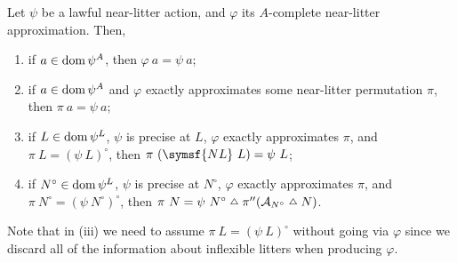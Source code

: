 \begin{lemma}
    \label{lem:NearLitterAction.complete_spec}
    Let \( \psi \) be a lawful near-litter action, and \( \varphi \) its \( A \)-complete near-litter approximation.
    Then,
    \begin{enumerate}
        \item if \( a \in \operatorname{dom} \psi^A \), then \( \varphi\ a = \psi\ a \);
        \item if \( a \in \operatorname{dom} \psi^A \) and \( \varphi \) exactly approximates some near-litter permutation \( \pi \), then \( \pi\ a = \psi\ a \);
        \item if \( L \in \operatorname{dom} \psi^L \), \( \psi \) is precise at \( L \), \( \varphi \) exactly approximates \( \pi \), and \( \pi\ L = (\psi\ L)^\circ \), then \( \pi\ (\symsf{NL}\ L) = \psi\ L \);
        \item if \( N^\circ \in \operatorname{dom} \psi^L \), \( \psi \) is precise at \( N^\circ \), \( \varphi \) exactly approximates \( \pi \), and \( \pi\ N^\circ = (\psi\ N^\circ)^\circ \), then \( \pi\ N = \psi\ N^\circ \symmdiff \pi '' (\mathcal A_{N^\circ} \symmdiff N) \).
    \end{enumerate}
\end{lemma}
Note that in (iii) we need to assume \( \pi\ L = (\psi\ L)^\circ \) without going via \( \varphi \) since we discard all of the information about inflexible litters when producing \( \varphi \).
